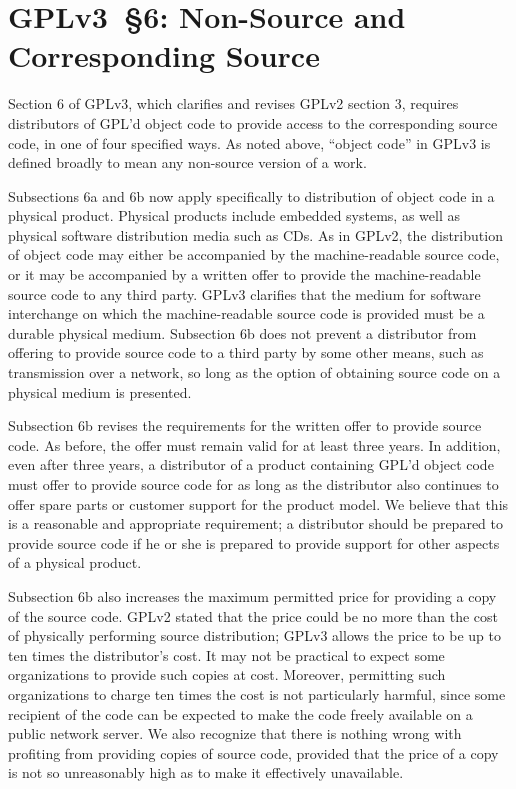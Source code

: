 \section{GPLv3~\S6: Non-Source and Corresponding Source}

Section 6 of GPLv3, which clarifies and revises GPLv2 section 3, requires
distributors of GPL'd object code to provide access to the corresponding
source code, in one of four specified ways. As noted above, ``object code''
in GPLv3 is defined broadly to mean any non-source version of a work.


Subsections 6a and 6b now apply specifically to distribution of object code
in a physical product. Physical products include embedded systems, as well as
physical software distribution media such as CDs. As in GPLv2, the
distribution of object code may either be accompanied by the machine-readable
source code, or it may be accompanied by a written offer to provide the
machine-readable source code to any third party. GPLv3 clarifies that the
medium for software interchange on which the machine-readable source code is
provided must be a durable physical medium. Subsection 6b does not prevent a
distributor from offering to provide source code to a third party by some
other means, such as transmission over a network, so long as the option of
obtaining source code on a physical medium is presented.


Subsection 6b revises the requirements for the written offer to provide
source code. As before, the offer must remain valid for at least three
years. In addition, even after three years, a distributor of a product
containing GPL'd object code must offer to provide source code for as long as
the distributor also continues to offer spare parts or customer support for
the product model. We believe that this is a reasonable and appropriate
requirement; a distributor should be prepared to provide source code if he or
she is prepared to provide support for other aspects of a physical product.


Subsection 6b also increases the maximum permitted price for providing a copy
of the source code. GPLv2 stated that the price could be no more than the
cost of physically performing source distribution; GPLv3 allows the price to
be up to ten times the distributor's cost. It may not be practical to expect
some organizations to provide such copies at cost. Moreover, permitting such
organizations to charge ten times the cost is not particularly harmful, since
some recipient of the code can be expected to make the code freely available
on a public network server. We also recognize that there is nothing wrong
with profiting from providing copies of source code, provided that the price
of a copy is not so unreasonably high as to make it effectively unavailable.


